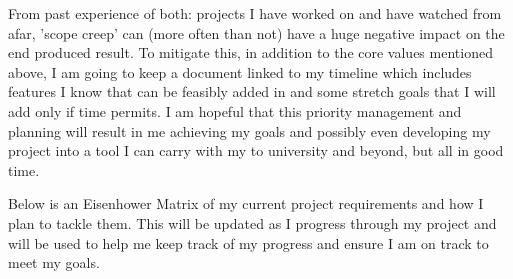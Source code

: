 From past experience of both: projects I have worked on and have watched from afar, 'scope creep' can (more often than not) have a huge negative impact on the end produced result. To mitigate this, in addition to the core values mentioned above, I am going to keep a document linked to my timeline which includes features I know that can be feasibly added in and some stretch goals that I will add only if time permits. I am hopeful that this priority management and planning will result in me achieving my goals and possibly even developing my project into a tool I can carry with my to university and beyond, but all in good time.

Below is an Eisenhower Matrix of my current project requirements and how I plan to tackle them. This will be updated as I progress through my project and will be used to help me keep track of my progress and ensure I am on track to meet my goals.


